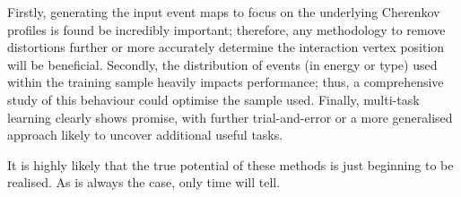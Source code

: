 Firstly, generating the input event maps to focus on the underlying Cherenkov profiles is found be
incredibly important; therefore, any methodology to remove distortions further or more accurately
determine the interaction vertex position will be beneficial. Secondly, the distribution of events
(in energy or type) used within the training sample heavily impacts performance; thus, a
comprehensive study of this behaviour could optimise the sample used. Finally, multi-task learning
clearly shows promise, with further trial-and-error or a more generalised approach likely to
uncover additional useful tasks.

It is highly likely that the true potential of these methods is just beginning to be realised. As
is always the case, only time will tell.